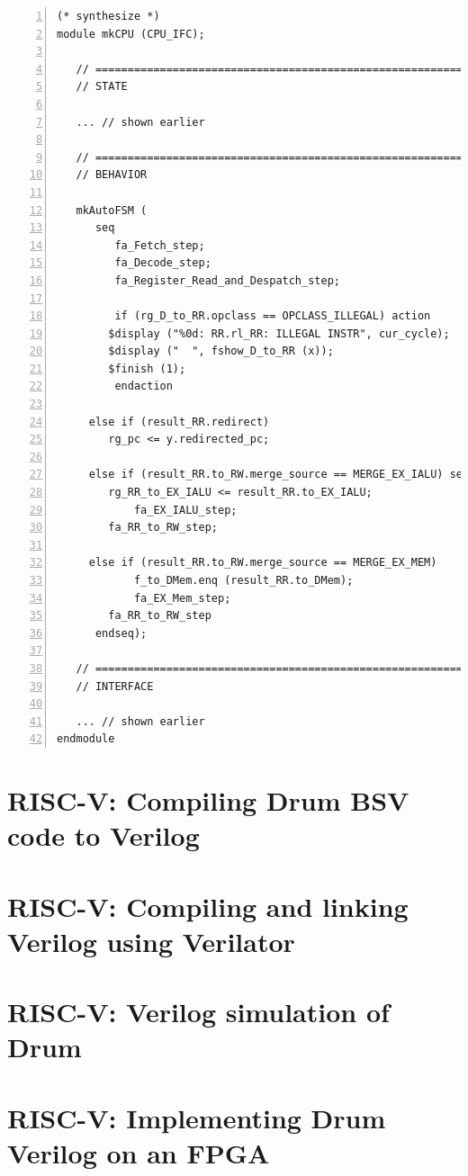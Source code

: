 \begin{Verbatim}[frame=single, numbers=left]
(* synthesize *)
module mkCPU (CPU_IFC);

   // ================================================================
   // STATE

   ... // shown earlier

   // ================================================================
   // BEHAVIOR

   mkAutoFSM (
      seq
         fa_Fetch_step;
         fa_Decode_step;
         fa_Register_Read_and_Despatch_step;

         if (rg_D_to_RR.opclass == OPCLASS_ILLEGAL) action
	    $display ("%0d: RR.rl_RR: ILLEGAL INSTR", cur_cycle);
	    $display ("  ", fshow_D_to_RR (x));
	    $finish (1);
         endaction

	 else if (result_RR.redirect)
	    rg_pc <= y.redirected_pc;

	 else if (result_RR.to_RW.merge_source == MERGE_EX_IALU) seq
	    rg_RR_to_EX_IALU <= result_RR.to_EX_IALU;
            fa_EX_IALU_step;
	    fa_RR_to_RW_step;

	 else if (result_RR.to_RW.merge_source == MERGE_EX_MEM)
            f_to_DMem.enq (result_RR.to_DMem);
            fa_EX_Mem_step;
	    fa_RR_to_RW_step
      endseq);

   // ================================================================
   // INTERFACE

   ... // shown earlier
endmodule

\end{Verbatim}


\section{RISC-V: Compiling Drum BSV code to Verilog}

\label{Sec_FSMs_Drum_compile_to_verilog}


\section{RISC-V: Compiling and linking Verilog using Verilator}

\label{Sec_FSMs_Drum_verilator}


\section{RISC-V: Verilog simulation of Drum}

\label{Sec_FSMs_Drum_simulation}


\section{RISC-V: Implementing Drum Verilog on an FPGA}

\label{Sec_FSMs_Drum_FPGA}

